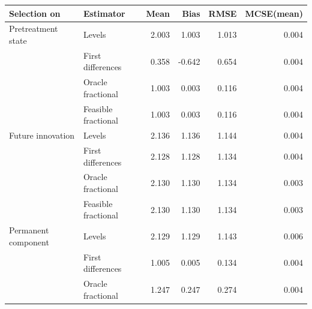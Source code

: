 \begin{tabular}{llrrrr}
\toprule
Selection on & Estimator & Mean & Bias & RMSE & MCSE(mean) \\
\midrule
Pretreatment state & Levels & 2.003 & 1.003 & 1.013 & 0.004 \\
 & First differences & 0.358 & -0.642 & 0.654 & 0.004 \\
 & Oracle fractional & 1.003 & 0.003 & 0.116 & 0.004 \\
 & Feasible fractional & 1.003 & 0.003 & 0.116 & 0.004 \\
\addlinespace
Future innovation & Levels & 2.136 & 1.136 & 1.144 & 0.004 \\
 & First differences & 2.128 & 1.128 & 1.134 & 0.004 \\
 & Oracle fractional & 2.130 & 1.130 & 1.134 & 0.003 \\
 & Feasible fractional & 2.130 & 1.130 & 1.134 & 0.003 \\
\addlinespace
Permanent component & Levels & 2.129 & 1.129 & 1.143 & 0.006 \\
 & First differences & 1.005 & 0.005 & 0.134 & 0.004 \\
 & Oracle fractional & 1.247 & 0.247 & 0.274 & 0.004 \\
\bottomrule
\end{tabular}
